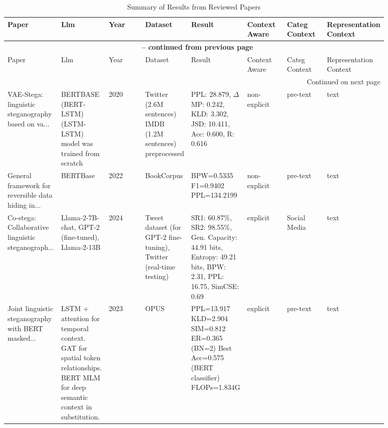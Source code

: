 \renewcommand{\arraystretch}{1.3}
\begin{longtable}{|p{0.11\linewidth}|p{0.11\linewidth}|p{0.11\linewidth}|p{0.11\linewidth}|p{0.11\linewidth}|p{0.11\linewidth}|p{0.11\linewidth}|p{0.11\linewidth}|}
\caption{Summary of Results from Reviewed Papers} \\
\hline

Paper & Llm & Year & Dataset & Result & Context Aware & Categ Context & Representation Context \\
\hline

\endfirsthead

\multicolumn{8}{|c|}{\bfseries \tablename\ \thetable{} -- continued from previous page} \\
\hline
Paper & Llm & Year & Dataset & Result & Context Aware & Categ Context & Representation Context \\
\hline

\endhead

\hline
\multicolumn{8}{|r|}{Continued on next page} \\
\endfoot

\hline
\endlastfoot

VAE-Stega: linguistic steganography based on va... \cite{yang2020vae} & BERTBASE (BERT-LSTM) (LSTM-LSTM) model was trained from scratch & 2020 & Twitter (2.6M sentences) IMDB (1.2M sentences) preprocessed & PPL: 28.879, \ensuremath{\Delta}MP: 0.242, KLD: 3.302, JSD: 10.411, Acc: 0.600, R: 0.616 & non-explicit & pre-text & text \\
\hline

General framework for reversible data hiding in... \cite{zheng2022general} & BERTBase & 2022 & BookCorpus & BPW=0.5335 F1=0.9402 PPL=134.2199 & non-explicit & pre-text & text \\
\hline

Co-stega: Collaborative linguistic steganograph... \cite{liao2024co} & Llama-2-7B-chat, GPT-2 (fine-tuned), Llama-2-13B & 2024 & Tweet dataset (for GPT-2 fine-tuning), Twitter (real-time testing) & SR1: 60.87\%, SR2: 98.55\%, Gen. Capacity: 44.91 bits, Entropy: 49.21 bits, BPW: 2.31, PPL: 16.75, SimCSE: 0.69 & explicit & Social Media & text \\
\hline

Joint linguistic steganography with BERT masked... \cite{ding2023joint} & LSTM + attention for temporal context. GAT for spatial token relationships. BERT MLM for deep semantic context in substitution. & 2023 & OPUS & PPL=13.917 KLD=2.904 SIM=0.812 ER=0.365 (BN=2) Best Acc=0.575 (BERT classifier) FLOPs=1.834G & explicit & pre-text & text \\
\hline


\end{longtable}
